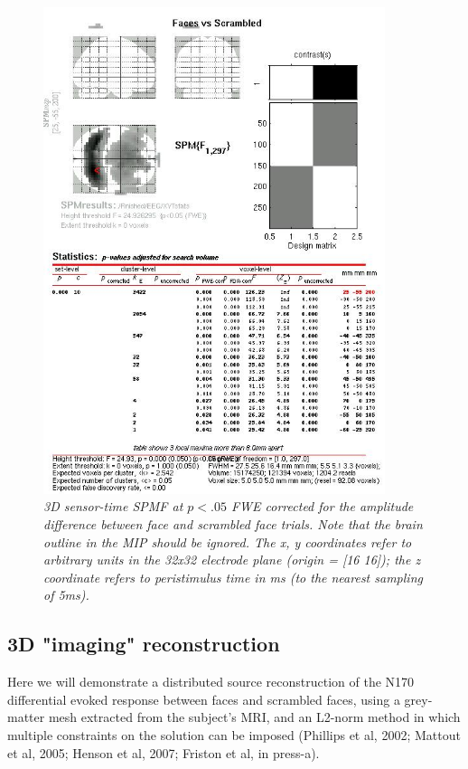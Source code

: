 \begin{figure}
\begin{center}
\includegraphics[width=100mm]{multimodal/figures/figure_32_7}
\caption{\em 3D sensor-time SPM{F} at $p<.05$ FWE corrected for the amplitude difference between face and scrambled face trials. Note that the brain outline in the MIP should be ignored. The x, y coordinates refer to arbitrary units in the 32x32 electrode plane (origin = [16 16]); the z coordinate refers to peristimulus time in ms (to the nearest sampling of 5ms). \label{fig_32_7}}
\end{center}
\end{figure}

\subsection{3D "imaging" reconstruction \label{3D}}

Here we will demonstrate a distributed source reconstruction of the N170 differential evoked response between faces and scrambled faces, using a grey-matter mesh extracted from the subject's MRI, and an L2-norm method in which multiple constraints on the solution can be imposed (Phillips et al, 2002; Mattout et al, 2005; Henson et al, 2007; Friston et al, in press-a).

